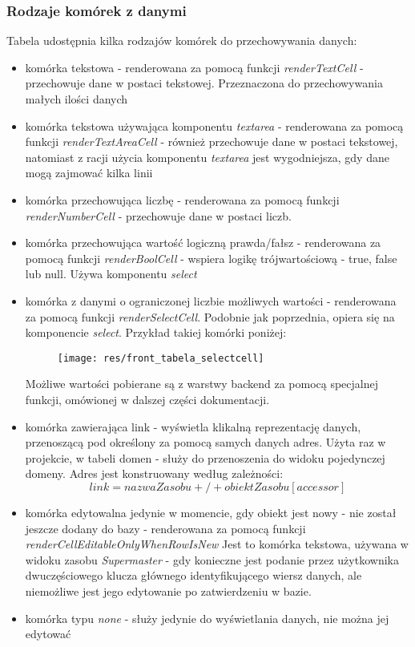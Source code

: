\documentclass[11pt]{article}
\begin{document}
\subsubsection{Rodzaje komórek z danymi}
Tabela udostępnia kilka rodzajów komórek do przechowywania danych:
\begin{itemize}
\item komórka tekstowa - renderowana za pomocą funkcji \emph{renderTextCell} - przechowuje dane w postaci tekstowej. Przeznaczona do przechowywania małych ilości danych
\item komórka tekstowa używająca komponentu \emph{textarea} - renderowana za pomocą funkcji \emph{renderTextAreaCell} - również przechowuje dane w postaci tekstowej, natomiast z racji użycia komponentu \emph{textarea} jest wygodniejsza, gdy dane mogą zajmować kilka linii
\item komórka przechowująca liczbę - renderowana za pomocą funkcji \emph{renderNumberCell} - przechowuje dane w postaci liczb. 
\item komórka przechowująca wartość logiczną prawda/fałsz - renderowana za pomocą funkcji \emph{renderBoolCell} - wspiera logikę trójwartościową - true, false lub null. Używa komponentu \emph{select}
\item komórka z danymi o ograniczonej liczbie możliwych wartości - renderowana za pomocą funkcji \emph{renderSelectCell}. Podobnie jak poprzednia, opiera się na komponencie \emph{select}. Przykład takiej komórki poniżej:
\begin{figure}[H]
\centering
\texttt{[image: res/front\_tabela\_selectcell]}
\end{figure}
Możliwe wartości pobierane są z warstwy backend za pomocą specjalnej funkcji, omówionej w dalszej części dokumentacji.
\item komórka zawierająca link - wyświetla klikalną reprezentację danych, przenoszącą pod określony za pomocą samych danych adres. Użyta raz w projekcie, w tabeli domen - służy do przenoszenia do widoku pojedynczej domeny. Adres jest konstruowany według zależności:
\begin{equation}
link = nazwaZasobu + / + obiektZasobu[accessor]
\end{equation}
\item komórka edytowalna jedynie w momencie, gdy obiekt jest nowy - nie został jeszcze dodany do bazy - renderowana za pomocą funkcji \emph{renderCellEditableOnlyWhenRowIsNew} Jest to komórka tekstowa, używana w widoku zasobu \emph{Supermaster} - gdy konieczne jest podanie przez użytkownika dwuczęściowego klucza głównego identyfikującego wiersz danych, ale niemożliwe jest jego edytowanie po zatwierdzeniu w bazie.
\item komórka typu \emph{none} - służy jedynie do wyświetlania danych, nie można jej edytować
\end{itemize}
\end{document}
